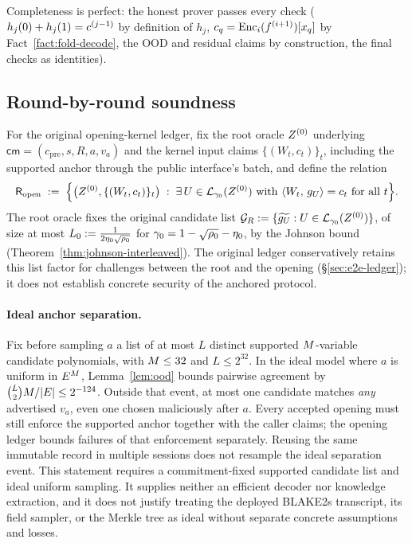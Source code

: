 Completeness is perfect: the honest prover passes every check ($h_j(0) + h_j(1) = c^{(j-1)}$ by definition of $h_j$, $c_q = \mathrm{Enc}_i(f^{(i+1)})[x_q]$ by Fact~\ref{fact:fold-decode}, the OOD and residual claims by construction, the final checks as identities).

\subsection{Round-by-round soundness}\label{sec:soundness}

For the original opening-kernel ledger, fix the root oracle $Z^{(0)}$ underlying $\mathsf{cm}=(c_{\mathrm{pre}},s,R,a,v_a)$ and the kernel input claims $\{(W_t,c_t)\}_t$, including the supported anchor through the public interface's batch, and define the relation
\[
\mathsf{R}_{\mathrm{open}} \;:=\; \Bigl\{ \bigl(Z^{(0)}, \{(W_t, c_t)\}_t\bigr) \;:\; \exists\, U \in \mathcal{L}_{\gamma_0}(Z^{(0)}) \text{ with } \langle W_t,\, g_U \rangle = c_t \text{ for all } t \Bigr\}.
\]
The root oracle fixes the original candidate list $\mathcal{G}_R:=\{\widetilde{g_U}:U\in\mathcal{L}_{\gamma_0}(Z^{(0)})\}$, of size at most $L_0:=\tfrac{1}{2\eta_0\sqrt{\rho_0}}$ for $\gamma_0=1-\sqrt{\rho_0}-\eta_0$, by the Johnson bound (Theorem~\ref{thm:johnson-interleaved}). The original ledger conservatively retains this list factor for challenges between the root and the opening (\S\ref{sec:e2e-ledger}); it does not establish concrete security of the anchored protocol.

\paragraph{Ideal anchor separation.} Fix before sampling $a$ a list of at most $L$ distinct supported $M$-variable candidate polynomials, with $M\le32$ and $L\le2^{32}$. In the ideal model where $a$ is uniform in $E^M$, Lemma~\ref{lem:ood} bounds pairwise agreement by $\binom{L}{2}M/|E|\le2^{-124}$. Outside that event, at most one candidate matches \emph{any} advertised $v_a$, even one chosen maliciously after $a$. Every accepted opening must still enforce the supported anchor together with the caller claims; the opening ledger bounds failures of that enforcement separately. Reusing the same immutable record in multiple sessions does not resample the ideal separation event. This statement requires a commitment-fixed supported candidate list and ideal uniform sampling. It supplies neither an efficient decoder nor knowledge extraction, and it does not justify treating the deployed BLAKE2s transcript, its field sampler, or the Merkle tree as ideal without separate concrete assumptions and losses.

